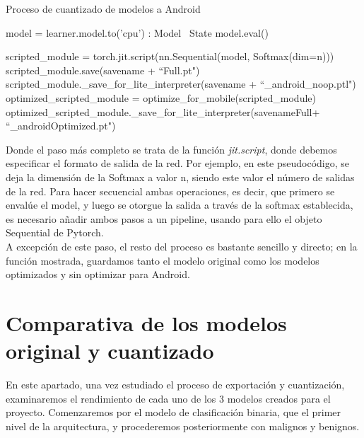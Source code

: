 \begin{algorithm}[H]
	\label{fig:cuantizado}
	\caption{Proceso de cuantizado de modelos a Android}
	\begin{algorithmic}
	
		\State model = learner.model.to('cpu') : Model
		\ State model.eval()
		
		 \State scripted\_module = torch.jit.script(nn.Sequential(model, Softmax(dim=n))) \\
	 	 \State scripted\_module.save(savename + ``Full.pt")\\  
		 \State scripted\_module.\_save\_for\_lite\_interpreter(savename + ``\_android\_noop.ptl")\\
		 \State optimized\_scripted\_module = optimize\_for\_mobile(scripted\_module) 
		 \State optimized\_scripted\_module.\_save\_for\_lite\_interpreter(savenameFull+ ``\_androidOptimized.pt")
	
		\EndProcedure
		
	\end{algorithmic}
\end{algorithm}

Donde el paso más completo se trata de la función  \textit{jit.script}, donde debemos especificar el formato de salida de la red. Por ejemplo, en este pseudocódigo, se deja la dimensión de la Softmax a valor n, siendo este valor el número de salidas de la red. Para hacer secuencial ambas operaciones, es decir, que primero se envalúe el model, y luego se otorgue la salida a través de la softmax establecida, es necesario añadir ambos pasos a un pipeline, usando para ello el objeto Sequential de Pytorch.\\

A excepción de este paso, el resto del proceso es bastante sencillo y directo; en la función mostrada, guardamos tanto el modelo original como los modelos optimizados y sin optimizar para Android.

\section{Comparativa de los modelos original y cuantizado}

En este apartado, una vez estudiado el proceso de exportación y cuantización, examinaremos el rendimiento de cada uno de los 3 modelos creados para el proyecto. Comenzaremos por el modelo de clasificación binaria, que el primer nivel de la arquitectura, y procederemos posteriormente con malignos y benignos.

